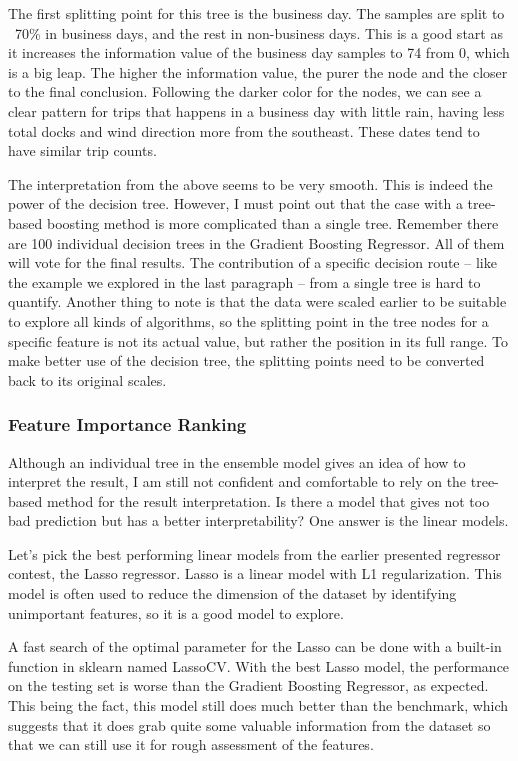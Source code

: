 \documentclass[a4paper]{article}
\begin{document}
			The first splitting point for this tree is the business day. The samples are split to ~70\% in business days, and the rest in non-business days. This is a good start as it increases the information value of the business day samples to 74 from 0, which is a big leap. The higher the information value, the purer the node and the closer to the final conclusion. Following the darker color for the nodes, we can see a clear pattern for trips that happens in a business day with little rain, having less total docks and wind direction more from the southeast. These dates tend to have similar trip counts.
			
			The interpretation from the above seems to be very smooth. This is indeed the power of the decision tree. However, I must point out that the case with a tree-based boosting method is more complicated than a single tree. Remember there are 100 individual decision trees in the Gradient Boosting Regressor. All of them will vote for the final results. The contribution of a specific decision route -- like the example we explored in the last paragraph -- from a single tree is hard to quantify. Another thing to note is that the data were scaled earlier to be suitable to explore all kinds of algorithms, so the splitting point in the tree nodes for a specific feature is not its actual value, but rather the position in its full range. To make better use of the decision tree, the splitting points need to be converted back to its original scales. 
			
			\subsubsection{Feature Importance Ranking}	
			Although an individual tree in the ensemble model gives an idea of how to interpret the result, I am still not confident and comfortable to rely on the tree-based method for the result interpretation. Is there a model that gives not too bad prediction but has a better interpretability? One answer is the linear models.
			
			Let's pick the best performing linear models from the earlier presented regressor contest, the Lasso regressor. Lasso is a linear model with L1 regularization. This model is often used to reduce the dimension of the dataset by identifying unimportant features, so it is a good model to explore. 
			
			A fast search of the optimal parameter for the Lasso can be done with a built-in function in sklearn named LassoCV. With the best Lasso model, the performance on the testing set is worse than the Gradient Boosting Regressor, as expected. This being the fact, this model still does much better than the benchmark, which suggests that it does grab quite some valuable information from the dataset so that we can still use it for rough assessment of the features. 
			
\end{document}
